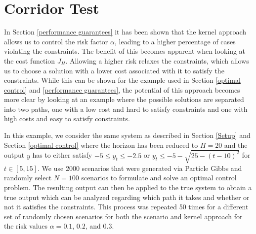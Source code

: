 \section{Corridor Test} \label{corridor}

In Section \ref{performance guarantees} it has been shown that the kernel approach allows us to control the risk factor $\alpha$, leading to a higher percentage of cases violating the constraints. The benefit of this becomes apparent when looking at the cost function $J_H$. Allowing a higher risk relaxes the constraints, which allows us to choose a solution with a lower cost associated with it to satisfy the constraints. While this can be shown for the example used in Section \ref{optimal control} and \ref{performance guarantees}, the potential of this approach becomes more clear by looking at an example where the possible solutions are separated into two paths, one with a low cost and hard to satisfy constraints and one with high costs and easy to satisfy constraints.

In this example, we consider the same system as described in Section \ref{Setup} and Section \ref{optimal control} where the horizon has been reduced to $H = 20$ and the output $y$ has to either satisfy $-5 \leq y_t \leq -2.5$ or $y_t \leq -5 - \sqrt{25- (t - 10)^2}$ for $t \in [5, 15]$. We use 2000 scenarios that were generated via Particle Gibbs and randomly select $N = 100$ scenarios to formulate and solve an optimal control problem. The resulting output can then be applied to the true system to obtain a true output which can be analyzed regarding which path it takes and whether or not it satisfies the constraints. This process was repeated 50 times for a different set of randomly chosen scenarios for both the scenario and kernel approach for the risk values $\alpha = 0.1$, $0.2$, and $0.3$.


